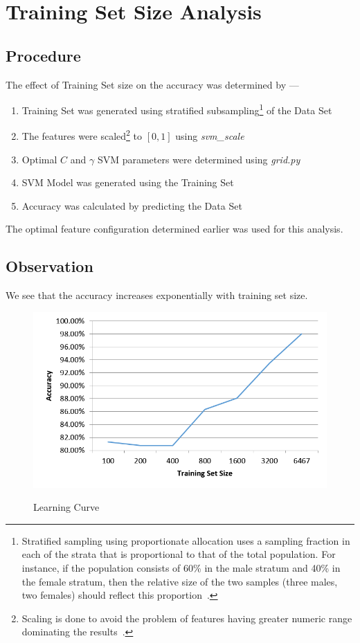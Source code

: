 \documentclass[a4paper,10pt]{report}
\begin{document}
\section{Training Set Size Analysis}

\subsection{Procedure}

The effect of Training Set size on the accuracy was determined by ---
\begin{enumerate}
\item Training Set was generated using stratified subsampling\footnote{Stratified sampling using proportionate allocation uses a sampling fraction in each of the 
strata that is proportional to that of the total population. For instance, if the population consists 
of 60\% in the male stratum and 40\% in the female stratum, then the relative size of the two samples (three males, two females) should reflect this proportion~\cite{stratified}.} 
of the Data Set
\item The features were scaled\footnote{Scaling is done to avoid the problem of features having greater numeric range dominating the results~\cite{libsvmppt}.} to $[0,1]$ using \emph{svm\_scale}
\item Optimal $C$ and $\gamma$ SVM parameters were determined using \emph{grid.py}
\item SVM Model was generated using the Training Set
\item Accuracy was calculated by predicting the Data Set
\end{enumerate}

\noindent The optimal feature configuration determined earlier was used for this analysis. 

\subsection{Observation}

We see that the accuracy increases exponentially with training set size. 

\begin{figure}[h!]
\centering
\includegraphics[width=\textwidth]{./diagrams/setsize}\\
\caption{Learning Curve}
\end{figure}
\end{document}
